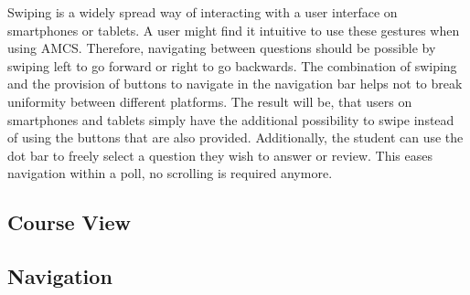 Swiping is a widely spread way of interacting with a user interface on smartphones or tablets. A user might find it intuitive to use these gestures when using AMCS. Therefore, navigating between questions should be possible by swiping left to go forward or right to go backwards. The combination of swiping and the provision of buttons to navigate in the navigation bar helps not to break uniformity between different platforms. The result will be, that users on smartphones and tablets simply have the additional possibility to swipe instead of using the buttons that are also provided.
Additionally, the student can use the dot bar to freely select a question they wish to answer or review. This eases navigation within a poll, no scrolling is required anymore.


\subsection{Course View}
\subsection{Navigation}
